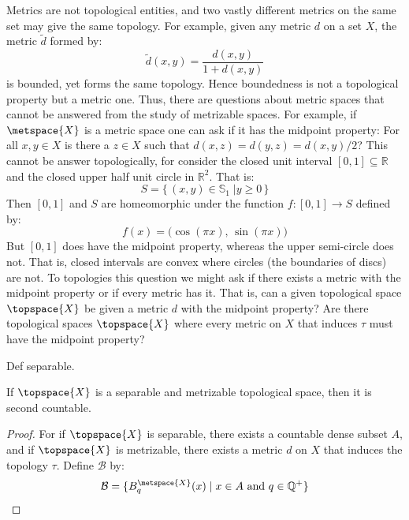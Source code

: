     \begin{example}
        Metrics are not topological entities, and two vastly different
        metrics on the same set may give the same topology. For example,
        given any metric $d$ on a set $X$, the metric $\tilde{d}$ formed by:
        \begin{equation}
            \tilde{d}(x,y)=\frac{d(x,y)}{1+d(x,y)}
        \end{equation}
        is bounded, yet forms the same topology. Hence boundedness is not a
        topological property but a metric one. Thus, there are questions
        about metric spaces that cannot be answered from the study of
        metrizable spaces. For example, if $\metspace{X}$ is a metric space
        one can ask if it has the midpoint property: For all $x,y\in{X}$
        is there a $z\in{X}$ such that $d(x,z)=d(y,z)=d(x,y)/2$? This cannot
        be answer topologically, for consider the closed unit interval
        $[0,1]\subseteq\mathbb{R}$ and the closed upper half unit circle in
        $\mathbb{R}^{2}$. That is:
        \begin{equation}
            S=\{\,(x,y)\in\mathbb{S}_{1}\;|y\geq{0}\,\}
        \end{equation}
        Then $[0,1]$ and $S$ are homeomorphic under the function
        $f:[0,1]\rightarrow{S}$ defined by:
        \begin{equation}
            f(x)=\big(\cos(\pi{x}),\,\sin(\pi{x})\big)
        \end{equation}
        But $[0,1]$ does have the midpoint property, whereas the upper
        semi-circle does not. That is, closed intervals are convex where
        circles (the boundaries of discs) are not. To topologies this
        question we might ask if there exists a metric with the midpoint
        property or if every metric has it. That is, can a given topological
        space $\topspace{X}$ be given a metric $d$ with the midpoint
        property? Are there topological spaces $\topspace{X}$ where every
        metric on $X$ that induces $\tau$ must have the midpoint property?
    \end{example}
    Def separable.
    \begin{theorem}
        If $\topspace{X}$ is a separable and metrizable topological space,
        then it is second countable.
    \end{theorem}
    \begin{proof}
        For if $\topspace{X}$ is separable, there exists a countable dense
        subset $A$, and if $\topspace{X}$ is metrizable, there exists a
        metric $d$ on $X$ that induces the topology $\tau$. Define
        $\mathcal{B}$ by:
        \begin{equation}
            \mathcal{B}=
                \{B_{q}^{\metspace{X}}(x)\;|\;
                    x\in{A}\textrm{ and }q\in\mathbb{Q^{+}}\}
        \end{equation}
    \end{proof}
